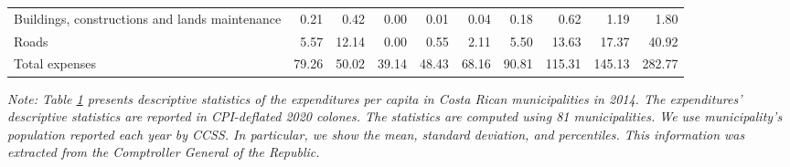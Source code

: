 \begin{table}[h]
\begin{center}
{\begin{tabular}{lrrrrrrrrr}
Buildings, constructions and lands maintenance & 0.21 & 0.42 & 0.00 & 0.01 & 0.04 & 0.18 & 0.62 & 1.19 & 1.80 \\
Roads & 5.57 & 12.14 & 0.00 & 0.55 & 2.11 & 5.50 & 13.63 & 17.37 & 40.92 \\
\hline
Total expenses & 79.26 & 50.02 & 39.14 & 48.43 & 68.16 & 90.81 & 115.31 & 145.13 & 282.77 \\
\hline
\hline
\end{tabular}}
\label{table:summ2014}
\end{center}
\footnotesize
\textit{Note: Table \ref{table:summ2014} presents descriptive statistics of the expenditures per capita in Costa Rican municipalities in 2014. The expenditures' descriptive statistics are reported in CPI-deflated 2020 colones. The statistics are computed using 81 municipalities. We use municipality's population reported each year by CCSS. In particular, we show the mean, standard deviation, and percentiles. This information was extracted from the Comptroller General of the Republic.}
\end{table}
